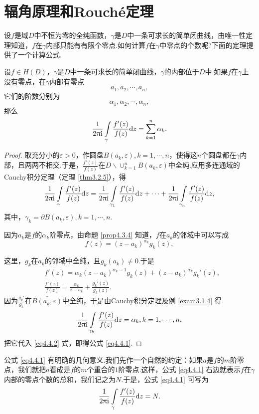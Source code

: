 \section{辐角原理和Rouch\'e定理\label{sec4.4}}
设$f$是域$D$中不恒为零的全纯函数，$\gamma$是$D$中一条可求长的简单闭曲线，由唯一性定理知道，$f$在$\gamma$内部只能有有限个零点.如何计算$f$在$\gamma$中零点的个数呢?下面的定理提供了一个计算公式.

\begin{theorem}\label{thm4.4.1}
设$f\in H(D)$，$\gamma$是$D$中一条可求长的简单闭曲线，$\gamma$的内部位于$D$中.如果$f$在$\gamma$上没有零点，在$\gamma$内部有零点
\[a_1,a_2,\cdots,a_n,\]
它们的阶数分别为
\[\alpha_1,\alpha_2,\cdots,\alpha_n,\]
那么
\begin{equation}\label{eq4.4.1}
\frac1{2\uppi\textrm i}\int\limits_{\gamma}\frac{f'(z)}{f(z)}\textrm dz=\sum_{k=1}^n\alpha_k.
\end{equation}
\end{theorem}
\begin{proof}
取充分小的$\varepsilon>0$，作圆盘$B(a_k,\varepsilon),k=1,\cdots,n$，使得这$n$个圆盘都在$\gamma$内部，且两两不相交.于是，$\frac{f'(z)}{f(z)}$在$D\backslash
\operatorname*{\cup}_{k=1}^nB(a_k,\varepsilon)$中全纯.应用多连通域的Cauchy积分定理（定理 \ref{thm3.2.5}），得
\begin{equation}\label{eq4.4.2}
\frac1{2\uppi\textrm i}\int\limits_{\gamma}\frac{f'(z)}{f(z)}\textrm dz
=\frac1{2\uppi\textrm i}\int\limits_{\gamma_1}\frac{f'(z)}{f(z)}\textrm dz+\cdots+
\frac1{2\uppi\textrm i}\int\limits_{\gamma_n}\frac{f'(z)}{f(z)}\textrm dz,
\end{equation}
其中，$\gamma_k=\partial B(a_k,\varepsilon),k=1,\cdots,n$.

因为$a_k$是$f$的$\alpha_k$阶零点，由命题 \ref{prop4.3.4} 知道，$f$在$a_k$的邻域中可以写成
\[f(z)=(z-a_k)^{\alpha_k}g_k(z),\]

这里，$g_k$在$a_k$的邻域中全纯，且$g_k(a_k)\ne0$.于是
\begin{align*}
&f'(z)=\alpha_k(z-a_k)^{\alpha_k-1}g_k(z)+(z-a_k)^{\alpha_k}g_k'(z),\\
&\frac{f'(z)}{f(z)}=\frac{\alpha_k}{z-a_k}+\frac{g_k'(z)}{g_k(z)}.
\end{align*}
因为$\frac{g_k'}{g_k}$在$\bar{B(a_k,\varepsilon)}$中全纯，于是由Cauchy积分定理及例 \ref{exam3.1.4} 得
\[\frac1{2\uppi\textrm i}\int\limits_{\gamma_k}\frac{f'(z)}{f(z)}\textrm dz=\alpha_k,k=1,\cdots,n.\]
把它代入 \eqref{eq4.4.2} 式，即得公式 \eqref{eq4.4.1}.
\end{proof}

公式 \eqref{eq4.4.1} 有明确的几何意义.我们先作一个自然的约定：如果$a$是$f$的$m$阶零点，我们就把$a$看成是$f$的$m$个重合的$1$阶零点.这样，公式 \eqref{eq4.4.1} 右边就表示$f$在$\gamma$内部的零点个数的总和，我们记之为$N$.于是，公式 \eqref{eq4.4.1} 可写为
\begin{equation}\label{eq4.4.3}
\frac1{2\uppi\textrm i}\int\limits_{\gamma}\frac{f'(z)}{f(z)}\textrm dz=N.
\end{equation}

